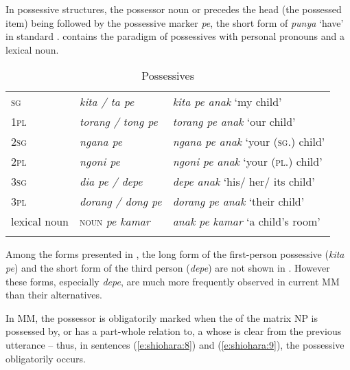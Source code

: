 \documentclass[output=paper
,modfonts
,nonflat]{langsci/langscibook}
\begin{document}
\noindent
In possessive structures, the possessor noun or  precedes the head (the possessed item) being followed by the possessive marker \textit{pe}, the short form of \textit{punya} ‘have’ in standard .  contains the paradigm of possessives with personal pronouns and a lexical noun.

\begin{table}
	\begin{tabularx}{\textwidth}{Xll}
		\lsptoprule
		1\textsc{sg} & \textit{kita / ta pe}  & \textit{kita pe anak} ‘my child’\\
		1\textsc{pl} & \textit{torang / tong pe} & \textit{torang pe anak} ‘our child’\\
		2\textsc{sg} & \textit{ngana pe} & \textit{ngana pe anak} ‘your (\textsc{sg}.) child’\\
		2\textsc{pl} & \textit{ngoni pe} & \textit{ngoni pe anak} ‘your (\textsc{pl}.) child’\\
		3\textsc{sg}\footnotemark & \textit{dia pe / depe}  & \textit{depe anak} ‘his/ her/ its child’\\
		3\textsc{pl} & \textit{dorang / dong pe} & \textit{dorang pe anak} ‘their child’\\
		lexical noun & \textsc{noun} \textit{pe kamar}  & \textit{anak pe} \textit{kamar} ‘a child’s room’\\
		\lspbottomrule
	\end{tabularx}
	\caption{Possessives}
	\label{tab:1}
\end{table}

Among the forms presented in , the long form of the first-person possessive (\textit{kita pe}) and the short form of the third person (\textit{depe}) are not shown in \citet[424]{Prentice1994}. However these forms, especially \textit{depe}, are much more frequently observed in current MM than their alternatives. 

In MM, the possessor is obligatorily marked when the  of the matrix NP is possessed by, or has a part-whole relation to, a  whose  is clear from the previous utterance – thus, in sentences (\ref{e:shiohara:8}) and (\ref{e:shiohara:9}), the possessive obligatorily occurs.
\end{document}
